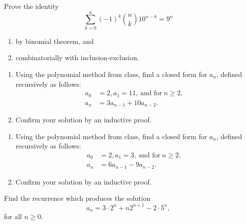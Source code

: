 \documentclass[12pt,letterpaper]{hmcpset}
\renewcommand{\c}[2]{\binom{#1}{#2}}
\renewcommand{\t}[1]{\text{#1}}
\begin{document}
\begin{problem}[5]
    Prove the identity 
    \[
        \sum_{k=0}^n(-1)^k\c{n}{k}10^{n-k}=9^n
    \]
    \begin{enumerate}
        \item by binomial theorem, and
        \item combinatorially with inclusion-exclusion.
    \end{enumerate}
\end{problem}
\begin{solution}
    \vfill
\end{solution}
\newpage

\begin{problem}[6]
    \begin{enumerate}
        \item Using the polynomial method from class, find a closed form for $a_n$, defined recursively as follows: 
            \begin{align*}
                a_0&=2,a_1=11,~\t{and for}~n\geq2,\\
                a_n&=3a_{n-1}+10a_{n-2}.
            \end{align*}
        \item Confirm your solution by an inductive proof.
    \end{enumerate}
\end{problem}
\begin{solution}
    \vfill
\end{solution}
\newpage

\begin{problem}[7]
    \begin{enumerate}
        \item Using the polynomial method from class, find a closed form for $a_n$, defined recursively as follows: 
            \begin{align*}
                a_0&=2,a_1=3,~\t{and for}~n\geq2,\\
                a_n&=6a_{n-1}-9a_{n-2}.
            \end{align*}
        \item Confirm your solution by an inductive proof.
    \end{enumerate}
\end{problem}
\begin{solution}
    \vfill
\end{solution}
\newpage

\begin{problem}[8]
    Find the recurrence which produces the solution
    \[
        a_n=3\cdot2^n+n2^{n+1}-2\cdot5^n,
    \]
    for all $n\geq0$.
\end{problem}
\begin{solution}
    \vfill
\end{solution}
\newpage
\end{document}
